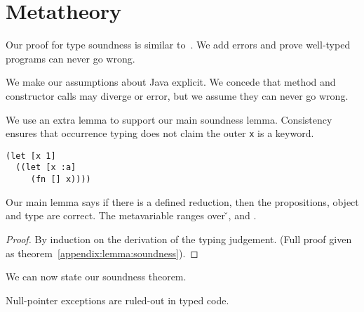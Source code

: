 \section{Metatheory}
\label{sec:metatheory}

Our proof for type soundness is similar to~\cite{TF10}. We add
errors and prove well-typed programs can never go wrong.

We make our assumptions about Java explicit. We concede that
method and constructor calls may diverge or error, but we assume they can
never go wrong.

{}



We use an extra lemma to support our main soundness lemma. Consistency
ensures that occurrence typing does not claim the outer 
\texttt{x} is a keyword. 

\begin{verbatim}
(let [x 1]
  ((let [x :a]
     (fn [] x))))
\end{verbatim}

{}

Our main lemma says if there is a defined reduction, then the propositions, object
and type are correct.
The metavariable  ranges over \v{}, \errorvalv{} and \wrong{}.

\begin{lemma}\label{main:lemma:soundness}

  {\soundnesslemmahypothesis}
  \begin{proof}
    By induction on the derivation of the typing judgement. 
    (Full proof given as theorem~\ref{appendix:lemma:soundness}).

  \end{proof}
\end{lemma}


We can now state our soundness theorem.

{}

{}

Null-pointer exceptions are ruled-out in typed code.

{}
